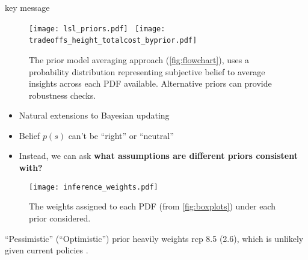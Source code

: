 \begin{block}{key message}
    \vspace*{-1em}
    \begin{framed}
        \begin{figure}
            \centering
            \texttt{[image: lsl\_priors.pdf]}~
            \texttt{[image: tradeoffs\_height\_totalcost\_byprior.pdf]}~
            \caption{
                The prior model averaging approach (\cref{fig:flowchart}), uses a probability distribution representing subjective belief to average insights across each PDF available.
                Alternative priors can provide robustness checks.
            }
        \end{figure}
    \end{framed}
    \begin{itemize}
        \item Natural extensions to Bayesian updating
        \item Belief $p(s)$ can't be ``right''  \cite{gelman_workflow:2020,gelman_philosophy:2013} or ``neutral'' \cite{quinn_exploratory:2020}
        \item Instead, we can ask \textbf{what assumptions are different priors consistent with?}
    \end{itemize}
    \begin{framed}
        \begin{figure}
            \centering
            \texttt{[image: inference\_weights.pdf]}
            \caption{
                The weights assigned to each PDF (from \cref{fig:boxplots}) under each prior considered.
            }
        \end{figure}
    \end{framed}
    ``Pessimistic'' (``Optimistic'') prior heavily weights \gls{rcp} 8.5 (2.6), which is unlikely given current policies \cite{hausfather_scenarios:2020}.
\end{block}